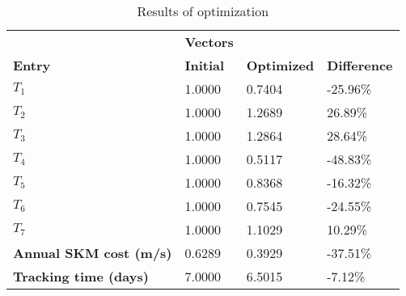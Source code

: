 \begin{table}[H]
\centering
\begin{tabular}{llll}
\textbf{}      & \cellcolor[HTML]{EFEFEF}\textbf{Vectors} & \textbf{} & \textbf{}         \\
\rowcolor[HTML]{EFEFEF} 
\textbf{Entry} & \textbf{Initial} & \textbf{Optimized} & \textbf{Difference} \\
$T_1$ & 1.0000 & 0.7404 & -25.96\% \\ 
$T_2$ & 1.0000 & 1.2689 & 26.89\% \\ 
$T_3$ & 1.0000 & 1.2864 & 28.64\% \\ 
$T_4$ & 1.0000 & 0.5117 & -48.83\% \\ 
$T_5$ & 1.0000 & 0.8368 & -16.32\% \\ 
$T_6$ & 1.0000 & 0.7545 & -24.55\% \\ 
$T_7$ & 1.0000 & 1.1029 & 10.29\% \\ 
\rowcolor[HTML]{EFEFEF} 
\textbf{Annual SKM cost (m/s)}  & 0.6289 & 0.3929 & -37.51\% \\ 
\rowcolor[HTML]{EFEFEF} 
\textbf{Tracking time (days)}  & 7.0000 & 6.5015 & -7.12\% \\ 
\end{tabular}
\caption{Results of optimization}
\label{tab:OptimizationAnalysis}
\end{table}